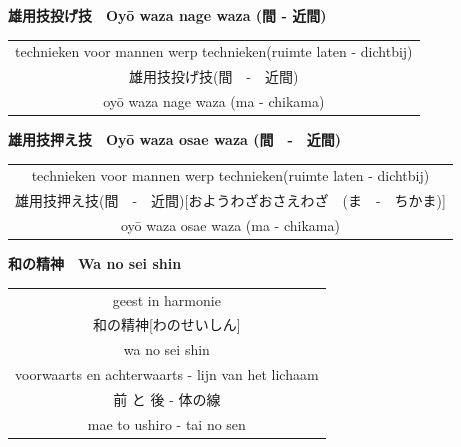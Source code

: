\documentclass[12pt]{scrartcl}
\begin{document}
\begin{CJK*}{UTF8}{min}
\newpage
\begin{center}
    \textbf{雄用技投げ技　Oy\={o} waza nage waza (間 - 近間)}
\end{center}
\begin{table}[H]
\begin{center}
\begin{tabular}{c}
technieken voor mannen werp technieken(ruimte laten - dichtbij)\\
雄用技投げ技(間　-　近間)\\
oy\={o} waza nage waza (ma - chikama)\\
\end{tabular}
\end{center}
\label{oyouwazanagewaza}
\end{table}

\begin{center}
    \textbf{雄用技押え技　Oy\={o} waza osae waza (間　-　近間)}
\end{center}
\begin{table}[H]
\begin{center}
\begin{tabular}{c}
technieken voor mannen werp technieken(ruimte laten - dichtbij)\\
雄用技押え技(間　-　近間)[おようわざおさえわざ　(ま　-　ちかま)]\\
oy\={o} waza osae waza (ma - chikama)\\
\end{tabular}
\end{center}
\label{oyouwazaosaewaza}
\end{table}

\begin{center}
    \textbf{和の精神　Wa no sei shin}
\end{center}
\begin{table}[H]
\begin{center}
\begin{tabular}{c}
geest in harmonie\\
和の精神[わのせいしん]\\
wa no sei shin\\
\hline
voorwaarts en achterwaarts - lijn van het lichaam\\
前 と 後 - 体の線\\
mae to ushiro - tai no sen
\end{tabular}
\end{center}
\label{wanoseishin}
\end{table}


\end{CJK*}
\end{document}
